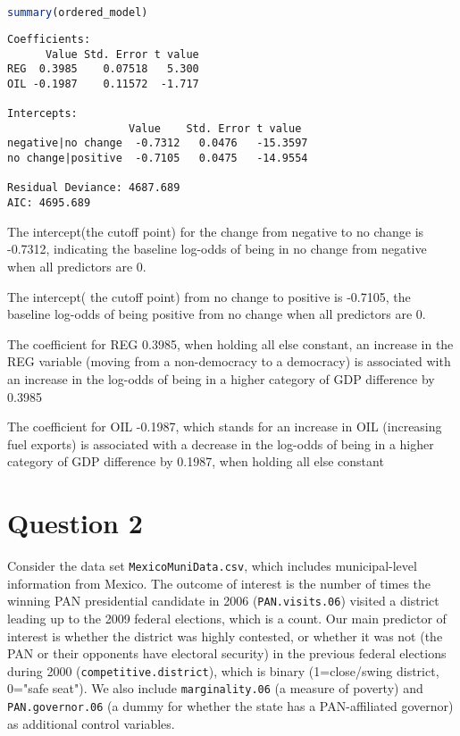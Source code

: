 \documentclass[12pt,letterpaper]{article}
\begin{document}
\begin{enumerate}
\begin{lstlisting}[language=R]
summary(ordered_model)
\end{lstlisting} 	
\begin{verbatim}
Coefficients:
      Value Std. Error t value
REG  0.3985    0.07518   5.300
OIL -0.1987    0.11572  -1.717

Intercepts:
                   Value    Std. Error t value 
negative|no change  -0.7312   0.0476   -15.3597
no change|positive  -0.7105   0.0475   -14.9554

Residual Deviance: 4687.689 
AIC: 4695.689 
\end{verbatim}
The intercept(the cutoff point) for the change from negative to no change is -0.7312, indicating the baseline log-odds of being in no change from negative when all predictors are 0.

The intercept( the cutoff point) from no change to positive is -0.7105, the baseline log-odds of being positive from no change when all predictors are 0.

 The coefficient for REG 0.3985, when holding all else constant, an increase in the REG variable (moving from a non-democracy to a democracy) is associated with an increase in the log-odds of being in a higher category of GDP difference by 0.3985

 The coefficient for OIL -0.1987, which stands for an increase in OIL (increasing fuel exports) is associated with a decrease in the log-odds of being in a higher category of GDP difference by 0.1987, when holding all else constant
 \end{enumerate}

\section*{Question 2} 
\vspace{.25cm}

\noindent Consider the data set \texttt{MexicoMuniData.csv}, which includes municipal-level information from Mexico. The outcome of interest is the number of times the winning PAN presidential candidate in 2006 (\texttt{PAN.visits.06}) visited a district leading up to the 2009 federal elections, which is a count. Our main predictor of interest is whether the district was highly contested, or whether it was not (the PAN or their opponents have electoral security) in the previous federal elections during 2000 (\texttt{competitive.district}), which is binary (1=close/swing district, 0="safe seat"). We also include \texttt{marginality.06} (a measure of poverty) and \texttt{PAN.governor.06} (a dummy for whether the state has a PAN-affiliated governor) as additional control variables. 
\end{document}
